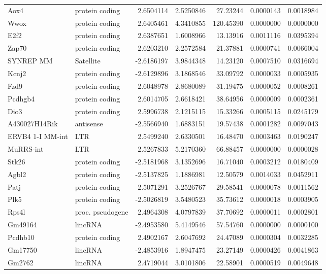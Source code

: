 \documentclass[onehalf,12pt]{beavtex}
\begin{document}
\begin{longtable}{llrrrrr}
  Aox4 & protein coding & 2.6504114 & 2.5250846 & 27.23244 & 0.0000143 & 0.0018984\\
  Wwox & protein coding & 2.6405461 & 4.3410855 & 120.45390 & 0.0000000 & 0.0000000\\
  E2f2 & protein coding & 2.6387651 & 1.6008966 & 13.13916 & 0.0011116 & 0.0395394\\
  \addlinespace
  Zap70 & protein coding & 2.6203210 & 2.2572584 & 21.37881 & 0.0000741 & 0.0066004\\
  SYNREP MM & Satellite & -2.6186197 & 3.9844348 & 14.23120 & 0.0007510 & 0.0316694\\
  Kcnj2 & protein coding & -2.6129896 & 3.1868546 & 33.09792 & 0.0000033 & 0.0005935\\
  Fzd9 & protein coding & 2.6048978 & 2.8680089 & 31.19475 & 0.0000052 & 0.0008261\\
  Pcdhgb4 & protein coding & 2.6014705 & 2.6618421 & 38.64956 & 0.0000009 & 0.0002361\\
  \addlinespace
  Dio3 & protein coding & 2.5996738 & 2.1215115 & 15.33266 & 0.0005115 & 0.0245179\\
  A430027H14Rik & antisense & -2.5566940 & 1.6883151 & 19.57438 & 0.0001282 & 0.0097043\\
  ERVB4 1-I MM-int & LTR & 2.5499240 & 2.6330501 & 16.48470 & 0.0003463 & 0.0190247\\
  MuRRS-int & LTR & 2.5267833 & 5.2170360 & 66.88457 & 0.0000000 & 0.0000028\\
  Stk26 & protein coding & -2.5181968 & 3.1352696 & 16.71040 & 0.0003212 & 0.0180409\\
  \addlinespace
  Agbl2 & protein coding & -2.5137825 & 1.1886981 & 12.50579 & 0.0014033 & 0.0452911\\
  Patj & protein coding & 2.5071291 & 3.2526767 & 29.58541 & 0.0000078 & 0.0011562\\
  Plk5 & protein coding & -2.5026819 & 3.5480523 & 35.73612 & 0.0000018 & 0.0003905\\
  Rps4l & proc. pseudogene & 2.4964308 & 4.0797839 & 37.70692 & 0.0000011 & 0.0002801\\
  Gm49164 & lincRNA & -2.4953580 & 5.4149546 & 57.54760 & 0.0000000 & 0.0000100\\
  \addlinespace
  Pcdhb10 & protein coding & 2.4902167 & 2.6047692 & 24.47089 & 0.0000304 & 0.0032285\\
  Gm17750 & lincRNA & -2.4853916 & 1.8947475 & 23.27149 & 0.0000426 & 0.0041863\\
  Gm2762 & lincRNA & 2.4719044 & 3.0101806 & 22.58901 & 0.0000519 & 0.0049648\\

\end{longtable}
\end{document}
